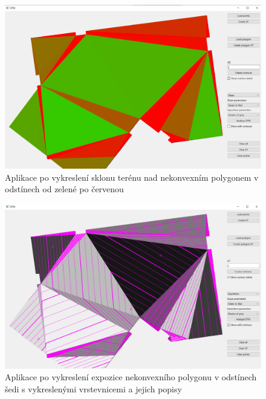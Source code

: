 \documentclass[11pt]{article}
\begin{document}
\begin{figure}[htbh]
	\centering
	\captionsetup{justification=centering}
	\includegraphics[scale=0.35]{images/vystup_AnalyzeDTM_slope_g2r_pol.png} 
	\caption{Aplikace po vykreslení sklonu terénu nad nekonvexním polygonem v odstínech od zelené po červenou}	\label{fig:vystup_AnalyzeDTM_slope_g2r_pol}
\end{figure} 
\begin{figure}[htbh]
	\centering
	\captionsetup{justification=centering}
	\includegraphics[scale=0.35]{images/vystup_AnalyzeDTM_exposition_shadesofgrey_pol_wContours.png} 
	\caption{Aplikace po vykreslení expozice nekonvexního polygonu v odstínech šedi s vykreslenými vrstevnicemi a jejich popisy}	\label{fig:vystup_AnalyzeDTM_exposition_shadesofgrey_pol_wContours}
\end{figure} 
\end{document}
